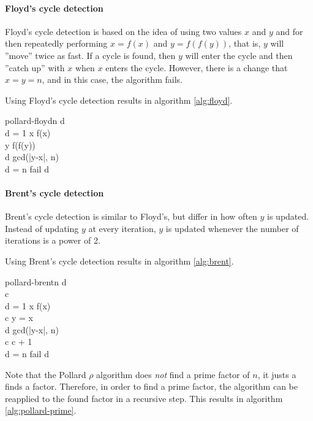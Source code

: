 \paragraph{Floyd's cycle detection}
Floyd's cycle detection is based on the idea of using two values $x$ and $y$
and for then repeatedly performing $x = f(x)$ and $y = f(f(y))$, that is, $y$
will ''move'' twice as fast. If a cycle is found, then $y$ will enter the cycle
and then ''catch up'' with $x$ when $x$ enters the cycle. 
However, there is a change that $x = y = n$, and in this case, the algorithm
fails.

Using Floyd's cycle
detection results in algorithm \ref{alg:floyd}.

\begin{pseudocode}{pollard-floyd}{n}
\label{alg:floyd}
d  \\
\WHILE d = 1 \DO
    \BEGIN
        x \GETS f(x) \\
        y \GETS f(f(y)) \\
        d \GETS gcd(|y-x|, n)
    \END \\
\IF d = n \THEN \RETURN fail \ELSE \RETURN d
\end{pseudocode}

\paragraph{Brent's cycle detection}
Brent's cycle detection is similar to Floyd's, but differ in how often $y$ is
updated. Instead of updating $y$ at every iteration, $y$ is updated whenever
the number of iterations is a power of 2.

Using Brent's cycle detection results in algorithm \ref{alg:brent}.

\begin{pseudocode}{pollard-brent}{n}
\label{alg:brent}
d  \\
c  \\
\WHILE d = 1 \DO
    \BEGIN
        x \GETS f(x) \\
        \IF c   \THEN
            y = x \\
        d \GETS gcd(|y-x|, n) \\
        c \GETS c + 1
    \END \\
\IF d = n \THEN \RETURN fail \ELSE \RETURN d
\end{pseudocode}

Note that the Pollard $\rho$ algorithm does \emph{not} find a prime factor of
$n$, it justs a finds a factor. Therefore, in order to find a prime factor, the
algorithm can be reapplied to the found factor in a recursive step. This results
in algorithm \ref{alg:pollard-prime}.

